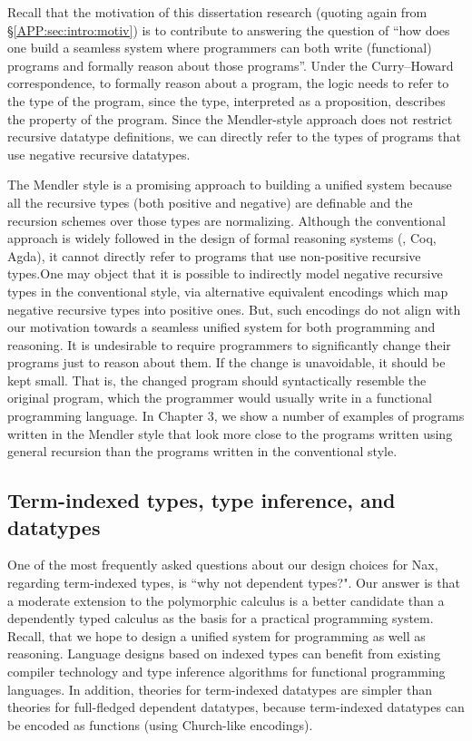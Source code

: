 Recall that the motivation of this dissertation research
(quoting again from \S\ref{APP:sec:intro:motiv})
is to contribute to answering the question of ``how does one build a
seamless system where programmers can both write (functional) programs and
formally reason about those programs''. Under the Curry--Howard correspondence,
to formally reason about a program, the logic needs to refer to the type of
the program, since the type, interpreted as a proposition, describes
the property of the program. Since the Mendler-style approach does not
restrict recursive datatype definitions, we can directly refer to the types
of programs that use negative recursive datatypes.

The Mendler style is a promising approach to building a unified system because
all the recursive types (both positive and negative) are definable and
the recursion schemes over those types are normalizing.
Although the conventional approach is widely followed
in the design of formal reasoning systems (\eg, Coq, Agda), it cannot directly
refer to programs that use non-positive recursive types.One may object that
it is possible to indirectly model negative recursive types
in the conventional style, via alternative equivalent encodings
which map negative recursive types into positive ones. But, such
encodings do not align with our motivation towards a seamless unified
system for both programming and reasoning. It is undesirable to require
programmers to significantly change their programs just to reason about them.
If the change is unavoidable, it should be kept small. That is,
the changed program should syntactically resemble the original program,
which the programmer would usually write in a functional programming language.
In Chapter 3, we show a number of examples of programs written in
the Mendler style that look more close to the programs written using
general recursion than the programs written in the conventional style.

\subsection{Term-indexed types, type inference, and datatypes}
\label{APP:sec:intro:concepts:indexed}
One of the most frequently asked questions about our design choices for Nax,
regarding term-indexed types, is ``why not dependent types?". Our answer
is that a moderate extension to the polymorphic calculus is a better candidate
than a dependently typed calculus as the basis for a practical programming
system. Recall, that we hope to design a unified system for programming
as well as reasoning. Language designs based on indexed types can
benefit from existing compiler technology and type inference algorithms
for functional programming languages. In addition, theories for
term-indexed datatypes are simpler than theories for full-fledged
dependent datatypes, because term-indexed datatypes can be encoded as
functions (using Church-like encodings).

